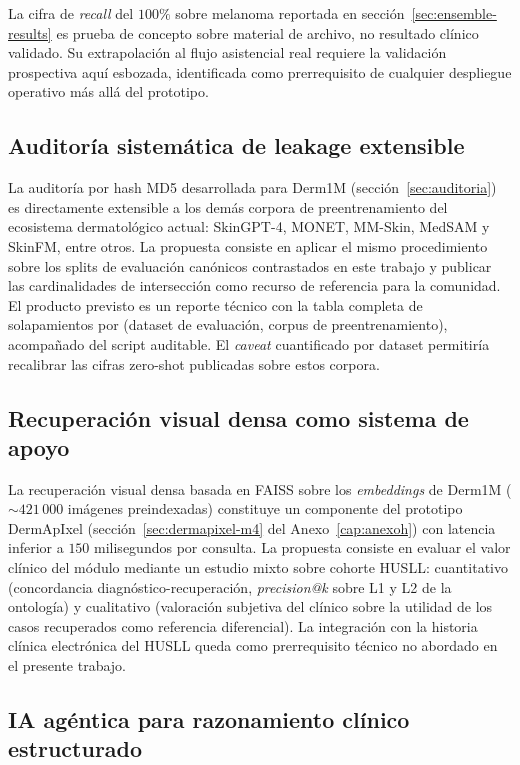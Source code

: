 La cifra de \emph{recall} del $100\%$ sobre melanoma reportada
en secci\'on~\ref{sec:ensemble-results} es prueba de concepto sobre
material de archivo, no resultado clínico validado. Su
extrapolación al flujo asistencial real requiere la validación
prospectiva aquí esbozada, identificada como prerrequisito de
cualquier despliegue operativo más allá del prototipo.

\subsection{Auditoría sistemática de leakage extensible}
\label{sec:linea-leakage}

La auditoría por hash MD5 desarrollada para Derm1M
(secci\'on~\ref{sec:auditoria}) es directamente extensible a los demás
corpora de preentrenamiento del ecosistema dermatológico actual:
SkinGPT-4, MONET, MM-Skin, MedSAM y SkinFM, entre otros. La
propuesta consiste en aplicar el mismo procedimiento sobre los
splits de evaluación canónicos contrastados en este trabajo y
publicar las cardinalidades de intersección como recurso de
referencia para la comunidad. El producto previsto es un reporte
técnico con la tabla completa de solapamientos por (dataset de
evaluación, corpus de preentrenamiento), acompañado del script
auditable. El \emph{caveat} cuantificado por dataset permitiría
recalibrar las cifras zero-shot publicadas sobre estos corpora.

\subsection{Recuperación visual densa como sistema de apoyo}
\label{sec:linea-rag}

La recuperación visual densa basada en FAISS sobre los
\emph{embeddings} de Derm1M ($\sim 421\,000$ imágenes
preindexadas) constituye un componente del prototipo DermApIxel
(secci\'on~\ref{sec:dermapixel-m4} del Anexo~\ref{cap:anexoh}) con
latencia inferior a $150$
milisegundos por consulta. La propuesta consiste en evaluar el
valor clínico del módulo mediante un estudio mixto sobre cohorte
HUSLL: cuantitativo (concordancia diagnóstico-recuperación,
\emph{precision@k} sobre L1 y L2 de la ontología) y cualitativo
(valoración subjetiva del clínico sobre la utilidad de los casos
recuperados como referencia diferencial). La integración con la
historia clínica electrónica del HUSLL queda como prerrequisito
técnico no abordado en el presente trabajo.

\subsection{IA agéntica para razonamiento clínico estructurado}
\label{sec:linea-agentica}

